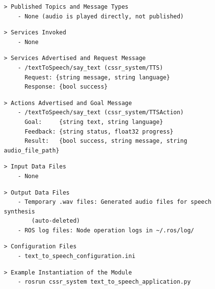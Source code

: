 \documentclass{CSSRforAfrica}
\newcommand{\checkboxChecked}{\fbox{\ding{51}}} %
\begin{document}
\begin{description}
\item[\checkboxChecked] 
{\small 
\begin{verbatim}                    
> Published Topics and Message Types
    - None (audio is played directly, not published)
\end{verbatim}}


\item[\checkboxChecked]
{\small
\begin{verbatim}
> Services Invoked
    - None
\end{verbatim}}


\item[\checkboxChecked]
{\small
\begin{verbatim}
> Services Advertised and Request Message
    - /textToSpeech/say_text (cssr_system/TTS)
      Request: {string message, string language}
      Response: {bool success}
\end{verbatim}}

\item[\checkboxChecked] 
{\small 
\begin{verbatim}
> Actions Advertised and Goal Message
    - /textToSpeech/say_text (cssr_system/TTSAction)
      Goal:     {string text, string language}
      Feedback: {string status, float32 progress}
      Result:   {bool success, string message, string audio_file_path}
\end{verbatim}}

\item[\checkboxChecked] 
{\small 
\begin{verbatim}
> Input Data Files
    - None
\end{verbatim}}

\item[\checkboxChecked] 
{\small 
\begin{verbatim}
> Output Data Files
    - Temporary .wav files: Generated audio files for speech synthesis
        (auto-deleted)
    - ROS log files: Node operation logs in ~/.ros/log/
\end{verbatim}}

\item[\checkboxChecked] 
{\small 
\begin{verbatim}
> Configuration Files
    - text_to_speech_configuration.ini
\end{verbatim}}

\item[\checkboxChecked] 
{\small 
\begin{verbatim}
> Example Instantiation of the Module
    - rosrun cssr_system text_to_speech_application.py
\end{verbatim}}


\end{description}
\end{document}
